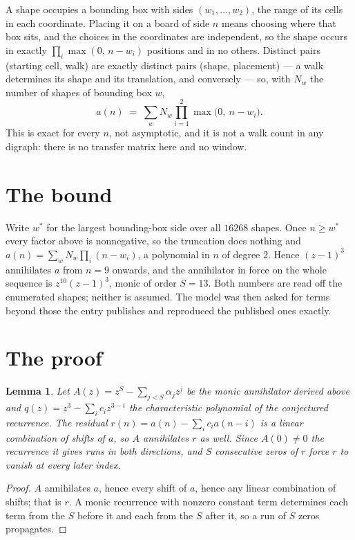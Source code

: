 \documentclass[11pt,a4paper]{article}
\theoremstyle{plain}
\newtheorem{lemma}[theorem]{Lemma}
\theoremstyle{definition}
\begin{document}
A shape occupies a bounding box with sides $(w_1,\dots,w_{2})$, the range of its cells in each
coordinate. Placing it on a board of side $n$ means choosing where that box sits, and the
choices in the coordinates are independent, so the shape occurs in exactly
$\prod_{i}\max(0,\,n-w_i)$ positions and in no others. Distinct pairs (starting cell,
walk) are exactly distinct pairs (shape, placement) --- a walk determines its shape and its
translation, and conversely --- so, with $N_w$ the number of shapes of bounding box $w$,
\[
a(n)\;=\;\sum_{w} N_w \prod_{i=1}^{2}\max\bigl(0,\ n-w_i\bigr).
\]
This is exact for every $n$, not asymptotic, and it is not a walk count in any digraph: there is
no transfer matrix here and no window.

\section{The bound}

Write $w^\ast$ for the largest bounding-box side over all $16268$ shapes. Once $n\ge w^\ast$
every factor above is nonnegative, so the truncation does nothing and
$a(n)=\sum_w N_w\prod_i(n-w_i)$, a polynomial in $n$ of degree $2$. Hence $(z-1)^{3}$
annihilates $a$ from $n=9$ onwards, and the annihilator in force on the whole sequence is
$z^{10}(z-1)^{3}$, monic of order $S=13$. Both numbers are read off the enumerated
shapes; neither is assumed. The model was then asked for terms beyond those the entry publishes
and reproduced the published ones exactly.

\section{The proof}

\begin{lemma}\label{lem:crit}
Let $A(z)=z^S-\sum_{j<S}\alpha_jz^{j}$ be the monic annihilator derived above and
$q(z)=z^{3}-\sum_ic_iz^{3-i}$ the characteristic polynomial of the conjectured
recurrence. The residual $r(n)=a(n)-\sum_ic_ia(n-i)$ is a linear combination of shifts of $a$,
so $A$ annihilates $r$ as well. Since $A(0)\ne0$ the recurrence it gives runs in both
directions, and $S$ consecutive zeros of $r$ force $r$ to vanish at every later index.
\end{lemma}

\begin{proof}
$A$ annihilates $a$, hence every shift of $a$, hence any linear combination of shifts; that is
$r$. A monic recurrence with nonzero constant term determines each term from the $S$ before it
and each from the $S$ after it, so a run of $S$ zeros propagates.
\end{proof}
\end{document}
